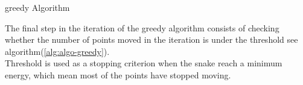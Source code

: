 \begin{algorithm}
        \BlankLine
                \caption{greedy Algorithm}\label{alg:algo-greedy}
\end{algorithm}

%
%
%
%

\hspace{-0.6cm}The final step in the iteration of the greedy algorithm consists of checking
whether the number of points moved in the iteration is under the threshold
see algorithm(\ref{alg:algo-greedy}).\\
Threshold is used as a stopping criterion when the snake reach a
minimum energy, which mean most of the points have stopped
moving.
%
